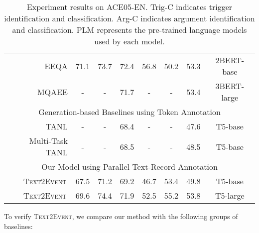 \documentclass[11pt,a4paper]{article}
\newcommand\modelname{\textsc{Text2Event}}
\begin{document}
\begin{table*}[!t]
\begin{tabular}{r|ccc|ccc|c}
    \midrule
    EEQA \citep{du-cardie-2020-event}                       & 71.1                                & 73.7                               & 72.4                             & 56.8       & 50.2       & 53.3        & 2BERT-base  \\
    MQAEE  \citep{li-etal-2020-event}                       & -                                   & -                                  & 71.7                             & -          & -          & 53.4        & 3BERT-large \\
    \midrule
    \multicolumn{8}{c}{Generation-based Baselines using Token Annotation}                                                                                                                                                               \\
    \midrule
    TANL \citep{paolini2021structured}                      & -                                   & -                                  & 68.4                             & -          & -          & 47.6        & T5-base             \\
    Multi-Task TANL \citep{paolini2021structured}           & -                                   & -                                  & 68.5                             & -          & -          & 48.5        & T5-base             \\
    \midrule
    \multicolumn{8}{c}{Our Model using Parallel Text-Record Annotation}                                                                                                                                                                 \\
    \midrule
    \modelname\,                                            & 67.5                                & 71.2                               & 69.2                             & 46.7       & 53.4       & 49.8        & T5-base             \\
    \modelname\,                                            & 69.6                                & 74.4                               & 71.9                             & 52.5       & 55.2       & 53.8        & T5-large            \\
    \bottomrule
  \end{tabular}
  \caption{Experiment results on ACE05-EN.
    Trig-C indicates trigger identification and classification.
    Arg-C indicates argument identification and classification.
    PLM represents the pre-trained language models used by each model.
  }
  \label{tab:overall_ace2005}\end{table*} 
To verify \modelname, we compare our method with the following groups of baselines:
\end{document}
